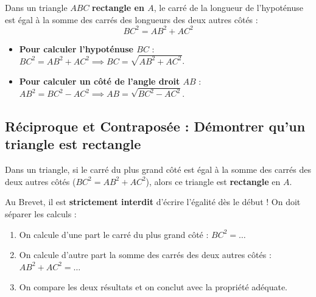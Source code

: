\begin{cadreprop}
Dans un triangle $ABC$ \textbf{rectangle en $A$}, le carré de la longueur de l'hypoténuse est égal à la somme des carrés des longueurs des deux autres côtés :
\[ BC^2 = AB^2 + AC^2 \]
\end{cadreprop}

\begin{center}
\end{center}

\begin{cadremethode}
\begin{itemize}
    \item \textbf{Pour calculer l'hypoténuse $BC$} :
    $BC^2 = AB^2 + AC^2 \implies BC = \sqrt{AB^2 + AC^2}$.
    \item \textbf{Pour calculer un côté de l'angle droit $AB$} :
    $AB^2 = BC^2 - AC^2 \implies AB = \sqrt{BC^2 - AC^2}$.
\end{itemize}
\end{cadremethode}

\subsection{Réciproque et Contraposée : Démontrer qu'un triangle est rectangle}

\begin{cadreprop}
Dans un triangle, si le carré du plus grand côté est égal à la somme des carrés des deux autres côtés ($BC^2 = AB^2 + AC^2$), alors ce triangle est \textbf{rectangle} en $A$.
\end{cadreprop}

\begin{cadrepiege}
Au Brevet, il est \textbf{strictement interdit} d'écrire l'égalité dès le début ! On doit séparer les calculs :
\begin{enumerate}
    \item On calcule d'une part le carré du plus grand côté : $BC^2 = \dots$
    \item On calcule d'autre part la somme des carrés des deux autres côtés : $AB^2 + AC^2 = \dots$
    \item On compare les deux résultats et on conclut avec la propriété adéquate.
\end{enumerate}
\end{cadrepiege}

